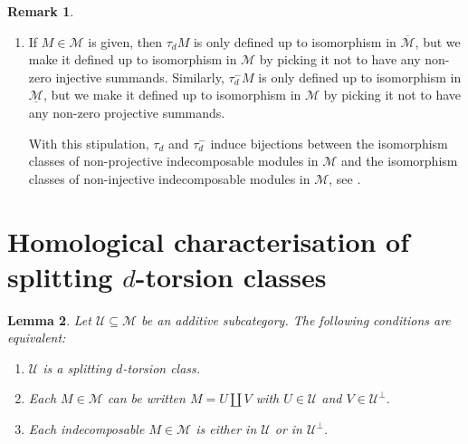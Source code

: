\documentclass[12pt,reqno]{amsart}
\def\cM{\mathscr{M}}
\def\cU{\mathscr{U}}
\numberwithin{equation}{section}
\newtheorem{Lemma}{Lemma}[section]
\theoremstyle{definition}
\newtheorem{Remark}[Lemma]{Remark}
\theoremstyle{theorem}
\theoremstyle{definition}
\begin{document}
\begin{Remark}
\begin{enumerate}
  \item  If $M \in \cM$ is given, then $\tau_d M$ is only defined up to isomorphism in $\overline{ \cM }$, but we make it defined up to isomorphism in $\cM$ by picking it not to have any non-zero injective summands.  Similarly, $\tau_d^- M$ is only defined up to isomorphism in $\underline{ \cM }$, but we make it defined up to isomorphism in $\cM$ by picking it not to have any non-zero projective summands.  

\medskip
\noindent
With this stipulation, $\tau_d$ and $\tau_d^-$ induce bijections between the isomorphism classes of non-projective indecomposable modules in $\cM$ and the isomorphism classes of non-injective indecomposable modules in $\cM\!$, see \cite[thm.\ 2.3]{Iyama_Higher-dimensional-AR-theory}.

\end{enumerate}
\end{Remark}




\section{Homological characterisation of splitting $d$-torsion classes}
\label{sec:splitting}


\begin{Lemma}
\label{lem:criterion_for_splitting}
Let $\cU \subseteq \cM$ be an additive subcategory.  The following conditions are equivalent:
\begin{enumerate}
\setlength\itemsep{4pt}

  \item  $\cU$ is a splitting $d$-torsion class.

  \item  Each $M \in \cM$ can be written $M = U \coprod V$ with $U \in \cU$ and $V \in \cU^{ \perp }$.

  \item  Each indecomposable $M \in \cM$ is either in $\cU$ or in $\cU^{ \perp }$.
  
\end{enumerate}
\end{Lemma}
\end{document}
